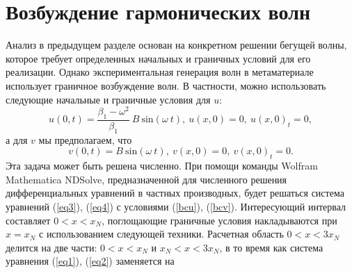 \section {Возбуждение гармонических волн}
Анализ в предыдущем разделе основан на конкретном решении бегущей волны, которое требует определенных начальных и граничных условий для его реализации. Однако экспериментальная генерация волн в метаматериале использует граничное возбуждение волн. В частности, можно использовать следующие начальные и граничные условия для $u$:
\begin{equation}\label{bcu}
u(0,t)=\frac{\beta_1-\omega^2}{\beta_1}~B~ {\text{sin}} (\omega ~t),~u(x,0)=0, ~u(x,0)_t=0,
\end{equation}
а для $ v $ мы предполагаем, что
\begin{equation}\label{bcv}
v(0,t)=B ~{\text{sin}} (\omega ~t),~v(x,0)=0, ~v(x,0)_t=0.
\end{equation}
Эта задача может быть решена численно. При помощи команды Wolfram Mathematica NDSolve, предназначенной для численного решения дифференциальных уравнений в частных производных, будет решаться система уравнений (\ref {eq3}), (\ref{eq4}) с условиями (\ref {bcu}), (\ref {bcv}).
Интересующий интервал составляет $ 0 <x < x_N $, поглощающие граничные условия накладываются при $ x = x_N $ с использованием следующей техники. Расчетная область $ 0 <x < 3 x_N $ делится на две части: $ 0 <x <x_N $ и $ x_N <x <3 x_N $, в то время как система уравнения (\ref {eq1}), (\ref {eq2}) заменяется на
